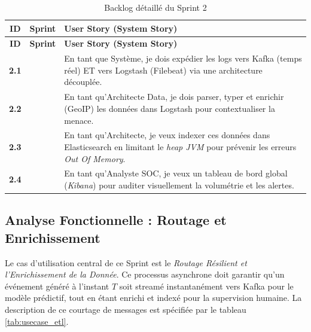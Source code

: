 \renewcommand{\arraystretch}{1.25}
\small
\begin{xltabular}{\textwidth}{|c|l|>{\raggedright\arraybackslash}X|}

\caption{Backlog détaillé du Sprint 2}
\label{tab:backlog_sprint2} \\

\hline
{}
\textbf{ID} & \textbf{Sprint} & \textbf{User Story (System Story)} \\ \hline
\endfirsthead

\hline
{}
\textbf{ID} & \textbf{Sprint} & \textbf{User Story (System Story)} \\ \hline
\endhead

\textbf{2.1} &  & En tant que Système, je dois expédier les logs vers Kafka (temps réel) ET vers Logstash (Filebeat) via une architecture découplée. \\  
\textbf{2.2} & & En tant qu'Architecte Data, je dois parser, typer et enrichir (GeoIP) les données dans Logstash pour contextualiser la menace. \\  
\textbf{2.3} & & En tant qu'Architecte, je veux indexer ces données dans Elasticsearch en limitant le \textit{heap JVM} pour prévenir les erreurs \textit{Out Of Memory}. \\  
\textbf{2.4} & & En tant qu'Analyste SOC, je veux un tableau de bord global (\textit{Kibana}) pour auditer visuellement la volumétrie et les alertes. \\ \hline

\end{xltabular}


\subsection{Analyse Fonctionnelle : Routage et Enrichissement}
Le cas d'utilisation central de ce Sprint est le \textit{Routage Résilient et l'Enrichissement de la Donnée}. Ce processus asynchrone doit garantir qu'un événement généré à l'instant $T$ soit streamé instantanément vers Kafka pour le modèle prédictif, tout en étant enrichi et indexé pour la supervision humaine. La description de ce courtage de messages est spécifiée par le tableau \ref{tab:usecase_etl}.

